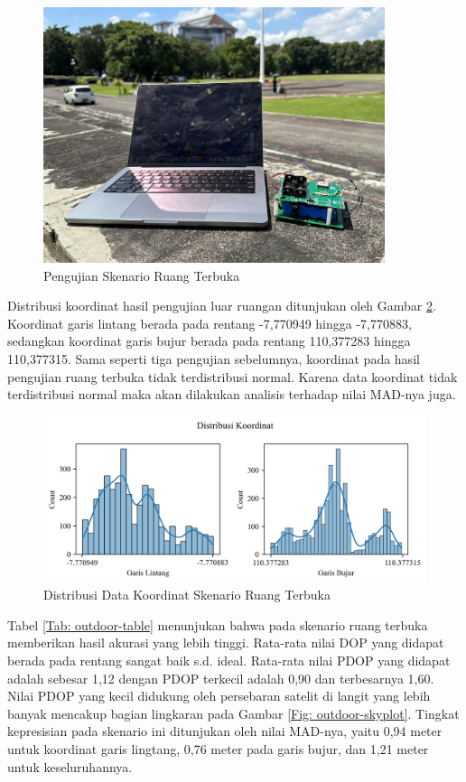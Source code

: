 \begin{figure}[H]
	\centering
	\includegraphics[width=10cm]{contents/chapter-4/4-skenario-outdoor/keadaan.jpg}
	\caption{Pengujian Skenario Ruang Terbuka}
	\label{Fig: outdoor-keadaan}
\end{figure}

Distribusi koordinat hasil pengujian luar ruangan ditunjukan oleh Gambar \ref{Fig:outdoor-distribution}. Koordinat garis lintang berada pada rentang -7,770949 hingga -7,770883, sedangkan koordinat garis bujur berada pada rentang 110,377283 hingga 110,377315. Sama seperti tiga pengujian sebelumnya, koordinat pada hasil pengujian ruang terbuka tidak terdistribusi normal. Karena data koordinat tidak terdistribusi normal maka akan dilakukan analisis terhadap nilai MAD-nya juga.

\begin{figure}[H]
	\centering
	\begin{adjustbox}{width=\textwidth}
		\includegraphics{contents/chapter-4/4-skenario-outdoor/distribution.png}
	\end{adjustbox}
	\caption{Distribusi Data Koordinat Skenario Ruang Terbuka}
	\label{Fig:outdoor-distribution}
\end{figure}

Tabel \ref{Tab: outdoor-table} menunjukan bahwa pada skenario ruang terbuka memberikan hasil akurasi yang lebih tinggi. Rata-rata nilai DOP yang didapat berada pada rentang sangat baik s.d. ideal. Rata-rata nilai PDOP yang didapat adalah sebesar 1,12 dengan PDOP terkecil adalah 0,90 dan terbesarnya 1,60. Nilai PDOP yang kecil didukung oleh persebaran satelit di langit yang lebih banyak mencakup bagian lingkaran pada Gambar \ref{Fig: outdoor-skyplot}. Tingkat kepresisian pada skenario ini ditunjukan oleh nilai MAD-nya, yaitu 0,94 meter untuk koordinat garis lingtang, 0,76 meter pada garis bujur, dan 1,21 meter untuk keseluruhannya.


